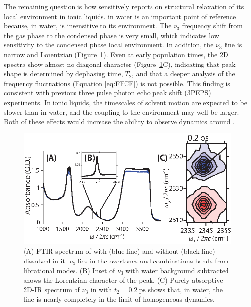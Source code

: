 \documentclass[%
  class = book,%
  crop = false,%
  float = true,%
  multi = true,%
  preview = false,%
]{standalone}
\begin{document}
The remaining question is how sensitively  reports on structural relaxation of its local environment in ionic liquids.  in water is an important point of reference because, in water,  is insensitive to its environment. The  \(\nu_3\) frequency shift from the gas phase to the condensed phase is very small, which indicates low sensitivity to the condensed phase local environment.  In addition, the  \(\nu_3\) line is narrow and Lorentzian (Figure~\ref{fig:CO2 in water}). Even at early population times, the 2D spectra show almost no diagonal character (Figure~\ref{fig:CO2 in water}C), indicating that peak shape is determined by dephasing time, \(T_2\), and that a deeper analysis of the frequency fluctuations (Equation \ref{eq:FFCF}) is not possible. This finding is consistent with previous three pulse photon echo peak shift (3PEPS) experiments.\cite{Hamm1998} In ionic liquids, the timescales of solvent motion are expected to be slower than in water, and the coupling to the environment may well be larger. Both of these effects would increase the ability to observe dynamics around .

\begin{figure}
  \centering
  \includegraphics[scale=1.25]{fig1.eps}
  \caption[Linear and 2D-IR of \texorpdfstring{ in }{carbon dioxide in water}]{\label{fig:CO2 in water}(A) FTIR spectrum of  with (blue line) and without (black line)  dissolved in it.  \(\nu_3\) lies in the overtones and combinations bands from  librational modes. (B) Inset of \(\nu_3\) with water background subtracted shows the Lorentzian character of the peak. (C) Purely absorptive 2D-IR spectrum of \(\nu_3\) in  with \(t_2 = \SI{0.2}{\ps}\) shows that, in water, the line is nearly completely in the limit of homogeneous dynamics.}
\end{figure}
\end{document}
